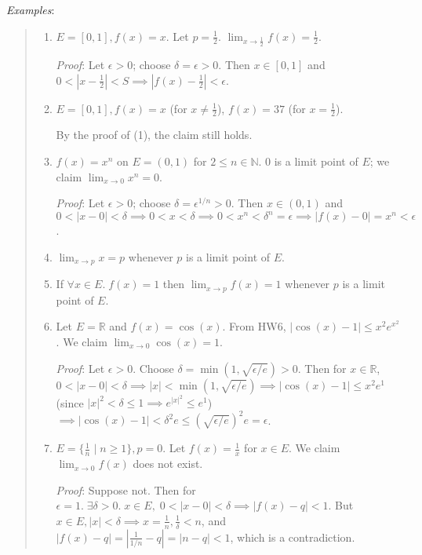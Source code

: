 \documentclass[11pt]{article}
\begin{document}
\emph{Examples}:
\begin{quote}\vspace{-0.3cm}
	\begin{enumerate}
	\item $E = [0,1], f(x) = x$. Let $p = \frac{1}{2}$. $\lim_{x \to \frac{1}{2}} f(x) = \frac{1}{2}$.

	\emph{Proof}: Let $\epsilon > 0$; choose $\delta = \epsilon > 0$. Then $x \in [0,1]$ and $0 < |x-\frac{1}{2}| < S \implies |f(x) - \frac{1}{2}| < \epsilon$.

	\item $E = [0,1], f(x) = x$ (for $x \neq \frac{1}{2}$), $f(x) = 37$ (for $x = \frac{1}{2}$).

	By the proof of (1), the claim still holds.

	\item $f(x) = x^n$ on $E = (0,1)$ for $2 \leq n \in \mathbb{N}$. 0 is a limit point of $E$; we claim $\lim_{x \to 0} x^n = 0$.

	\emph{Proof}: Let $\epsilon > 0$; choose $\delta = \epsilon^{1/n} > 0$. Then $x \in (0,1)$ and $0 < |x-0| < \delta \implies 0 < x < \delta \implies 0 < x^n < \delta^n = \epsilon \implies |f(x) - 0| = x^n < \epsilon$.

	\item $\lim_{x \to p} x = p$ whenever $p$ is a limit point of $E$.

	\item If $\forall x \in E.\; f(x) = 1$ then $\lim_{x \to p} f(x) = 1$ whenever $p$ is a limit point of $E$.

	\item Let $E = \mathbb{R}$ and $f(x) = \cos(x)$. From HW6, $|\cos(x) - 1| \leq x^2 e^{x^2}$. We claim $\lim_{x \to 0} \cos(x) = 1$.

	\emph{Proof}: Let $\epsilon > 0$. Choose $\delta = \min(1, \sqrt{\epsilon/e}) > 0$. Then for $x \in \mathbb{R}$, $0 < |x - 0| < \delta \implies |x| < \min(1, \sqrt{\epsilon/e}) \implies |\cos(x) - 1| \leq x^2 e^1$ (since $|x|^2 < \delta \leq 1 \implies e^{|x|^2} \leq e^1$) $\implies |\cos(x) - 1| < \delta^2 e \leq (\sqrt{\epsilon/e})^2 e = \epsilon$.

	\item $E = \{\frac{1}{n} \;|\; n \geq 1\}, p=0$. Let $f(x) = \frac{1}{x}$ for $x \in E$. We claim $\lim_{x \to 0} f(x)$ does not exist.

	\emph{Proof}: Suppose not. Then for $\epsilon = 1.\; \exists \delta > 0.\; x \in E,\; 0 < |x - 0| < \delta \implies |f(x) - q| < 1$. But $x \in E, |x| < \delta \implies x = \frac{1}{n}, \frac{1}{\delta} < n$, and $|f(x) - q| = |\frac{1}{1/n} - q| = |n - q| < 1$, which is a contradiction.
	\end{enumerate}
\end{quote}
\end{document}
